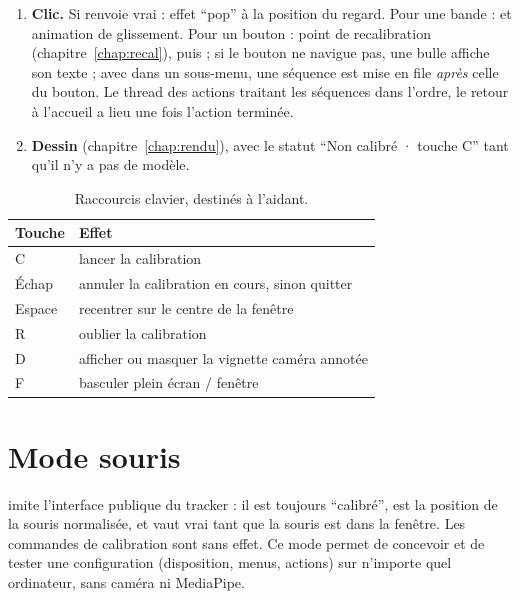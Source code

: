 \begin{enumerate}
\begin{itemize}
    \item case avec un bouton : $D$ = durée du bouton, ou réglage global ; l'anneau prend la couleur du bouton ;
    \item zone morte, case vide ou regard perdu : .
  \end{itemize}
  \item \textbf{Clic.} Si  renvoie vrai : effet \enquote{pop} à la position du regard. Pour une bande :  et animation de glissement. Pour un bouton : point de recalibration (chapitre~\ref{chap:recal}), puis  ; si le bouton ne navigue pas, une bulle affiche son texte ; avec  dans un sous-menu, une séquence  est mise en file \emph{après} celle du bouton. Le thread des actions traitant les séquences dans l'ordre, le retour à l'accueil a lieu une fois l'action terminée.
  \item \textbf{Dessin} (chapitre~\ref{chap:rendu}), avec le statut \enquote{Non calibré · touche C} tant qu'il n'y a pas de modèle.
\end{enumerate}

\begin{table}[H]
\centering\small
\begin{tabular}{@{}ll@{}}
\toprule
Touche & Effet \\
\midrule
C & lancer la calibration \\
Échap & annuler la calibration en cours, sinon quitter \\
Espace & recentrer sur le centre de la fenêtre \\
R & oublier la calibration \\
D & afficher ou masquer la vignette caméra annotée \\
F & basculer plein écran / fenêtre \\
\bottomrule
\end{tabular}
\caption{Raccourcis clavier, destinés à l'aidant.}
\label{tab:touches}
\end{table}

\section{Mode souris}

 imite l'interface publique du tracker : il est toujours \enquote{calibré},  est la position de la souris normalisée, et  vaut vrai tant que la souris est dans la fenêtre. Les commandes de calibration sont sans effet. Ce mode permet de concevoir et de tester une configuration (disposition, menus, actions) sur n'importe quel ordinateur, sans caméra ni MediaPipe.

